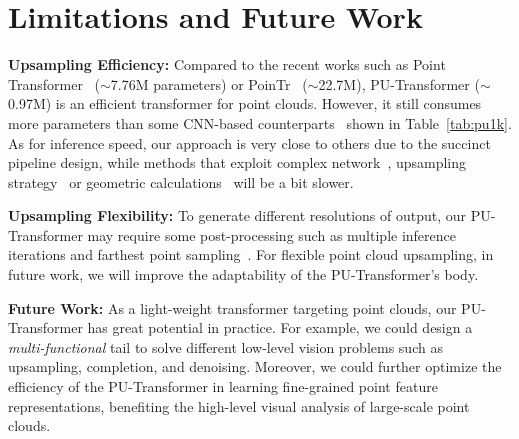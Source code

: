 \section{Limitations and Future Work}
\noindent 
\textbf{Upsampling Efficiency:}
Compared to the recent works such as Point Transformer~\cite{zhao2021point} ($\sim$7.76M parameters) or PoinTr~\cite{yu2021pointr} ($\sim$22.7M), PU-Transformer ($\sim$0.97M) is an efficient transformer for point clouds. However, it still consumes more parameters than some CNN-based counterparts~\cite{yu2018pu,qi2019deep,qian2021pu,li2021point} shown in Table~\ref{tab:pu1k}. As for inference speed, our approach is very close to others due to the succinct pipeline design, while methods that exploit complex network~\cite{li2019pu}, upsampling strategy~\cite{li2021point} or geometric calculations~\cite{qian2020pugeo} will be a bit slower.

\noindent
\textbf{Upsampling Flexibility:}
To generate different resolutions of output, our PU-Transformer may require some post-processing such as multiple inference iterations and farthest point sampling~\cite{qi2017pointnet}. For flexible point cloud upsampling, in future work, we will improve the adaptability of the PU-Transformer's body.

\noindent 
\textbf{Future Work:}
As a light-weight transformer targeting point clouds, our PU-Transformer has great potential in practice. For example, we could design a \emph{multi-functional} tail to solve different low-level vision problems such as upsampling, completion, and denoising. Moreover, we could further optimize the efficiency of the PU-Transformer in learning fine-grained point feature representations, benefiting the high-level visual analysis of large-scale point clouds.